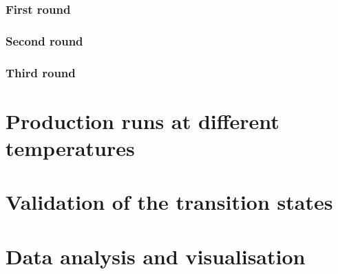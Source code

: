 \subsubsection{First round}

\subsubsection{Second round}

\subsubsection{Third round}



\section{Production runs at different temperatures}



\section{Validation of the transition states}



\section{Data analysis and visualisation}